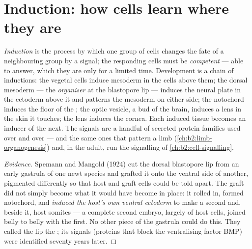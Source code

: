 \section{Induction: how cells learn where they are}

\begin{definition}\label{def:b2:vertebrate-development:induction}
\emph{Induction} is the process by which one group of cells changes
the fate of a neighbouring group by a signal; the responding cells
must be \emph{competent} --- able to answer, which they are only for
a limited time. Development is a chain of inductions: the vegetal
cells induce mesoderm in the cells above them; the dorsal mesoderm
--- the \emph{organiser} at the blastopore lip --- induces the
neural plate in the ectoderm above it and patterns the mesoderm on
either side; the notochord induces the floor of the ; the
optic vesicle, a bud of the brain, induces a lens in the skin it
touches; the lens induces the cornea. Each induced tissue becomes an
inducer of the next. The signals are a handful of secreted protein
families used over and over --- and the same ones that pattern a
limb (\cref{ch:b2:limb-organogenesis}) and, in the adult, run the
signalling of \cref{ch:b2:cell-signalling}.
\end{definition}
\begin{proof}[Evidence]
Spemann and Mangold (1924) cut the dorsal blastopore lip from an
early gastrula of one newt species and grafted it onto the ventral
side of another, pigmented differently so that host and graft cells
could be told apart. The graft did not simply become what it would
have become in place: it rolled in, formed notochord, and
\emph{induced the host's own ventral ectoderm} to make a second
 and, beside it, host somites --- a complete second
embryo, largely of host cells, joined belly to belly with the first.
No other piece of the gastrula could do this. They called the lip
the ; its signals (proteins that block the ventralising
factor BMP) were identified seventy years later.
\end{proof}

